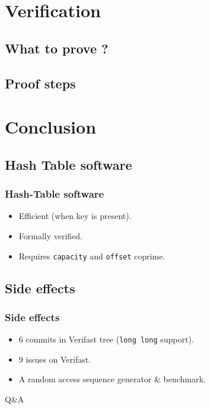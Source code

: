\documentclass{beamer}
\begin{document}
\section{Verification}
\subsection{What to prove ?}
\subsection{Proof steps}


\section{Conclusion}
\subsection{Hash Table software}
\begin{frame}
	\frametitle{Hash-Table software}
	\begin{itemize}
		\item Efficient (when key is present).
		\item Formally verified.
		\item Requires \texttt{capacity} and \texttt{offset} coprime.
	\end{itemize}
\end{frame}

\subsection{Side effects}
\begin{frame}
	\frametitle{Side effects}
	\begin{itemize}
		\item 6 commits in Verifast tree (\texttt{long long} support).
		\item 9 issues on Verifast.
		\item A random access sequence generator \& benchmark.
	\end{itemize}
\end{frame}



\begin{frame}
\begin{center}
\huge{Q\&A}
\end{center}
\end{frame}
\end{document}
